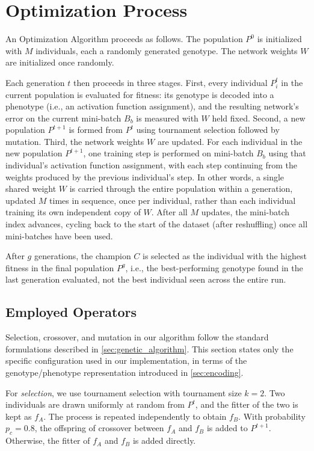\section{Optimization Process}

An Optimization Algorithm proceeds as follows. 
The population $P^0$ is initialized with $M$ individuals, each a randomly generated genotype.
The network weights $W$ are initialized once randomly.

Each generation $t$ then proceeds in three stages. First, every individual
$P^t_i$ in the current population is evaluated for fitness: its genotype is
decoded into a phenotype (i.e., an activation function assignment), and the
resulting network's error on the current mini-batch $B_b$ is measured with
$W$ held fixed. Second, a new population $P^{t+1}$ is formed
from $P^t$ using tournament selection followed by mutation. 
Third, the network weights $W$ are updated.
For each individual in the new population $P^{t+1}$, one training step is
performed on mini-batch $B_b$ using that individual's activation function
assignment, with each step continuing from the weights produced by the
previous individual's step. In other words, a single shared
weight $W$ is carried through the entire population within a
generation, updated $M$ times in sequence, once per individual, rather
than each individual training its own independent copy of $W$. After all $M$
updates, the mini-batch index advances, cycling back to the start of the
dataset (after reshuffling) once all mini-batches have been used.

After $g$ generations, the champion $C$ is selected as the individual with
the highest fitness in the final population $P^g$, i.e., the best-performing genotype found in the last generation evaluated, not the
best individual seen across the entire run.

\subsection{Employed Operators}
Selection, crossover, and mutation in our algorithm follow the standard
formulations described in \ref{sec:genetic_algorithm}. This section states only the
specific configuration used in our implementation, in terms of the
genotype/phenotype representation introduced in \ref{sec:encoding}.

For \emph{selection}, we use tournament selection with tournament size
$k=2$. Two individuals are drawn uniformly at random from $P^t$, and the
fitter of the two is kept as $f_A$. The process is repeated independently
to obtain $f_B$. With probability $p_c = 0.8$, the offspring of crossover
between $f_A$ and $f_B$ is added to $P^{t+1}$. Otherwise, the fitter of
$f_A$ and $f_B$ is added directly.

